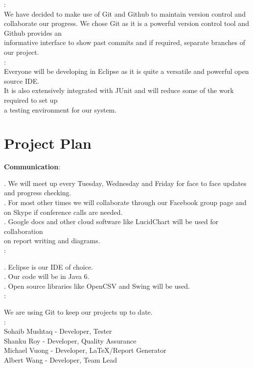 \documentclass[a4paper]{article}
\begin{document}
: \\
\indent We have decided to make use of Git and Github to maintain version control and collaborate 
our progress. We chose Git as it is a powerful version control tool and Github provides an  \\
informative interface to show past commits and if required, separate branches of our project. \\

: \\
\indent Everyone will be developing in Eclipse as it is quite a versatile and powerful open source IDE. \\
It is also extensively integrated with JUnit and will reduce some of the work required to set up \\
a testing environment for our system.

\section {Project Plan}

{\bf Communication}: 

.  We will meet up every Tuesday, Wednesday and Friday for face to face updates and progress checking. \\
. For most other times we will collaborate through our Facebook group page and \\
on Skype if conference calls are needed. \\
. Google docs and other cloud software like LucidChart will be used for collaboration \\
 on report writing and diagrams. \\

:

\indent{}. Eclipse is our IDE of choice. \\
\indent{}. Our code will be in Java 6. \\
\indent{}. Open source libraries like OpenCSV and Swing will be used. \\

:

We are using Git to keep our projects up to date. \\

: \\
\indent\indent Sohaib Mushtaq - Developer, Tester \\
\indent\indent Shanku Roy - Developer, Quality Assurance \\
\indent\indent Michael Vuong - Developer, LaTeX/Report Generator \\
\indent\indent Albert Wang -  Developer, Team Lead \\
\end{document}
